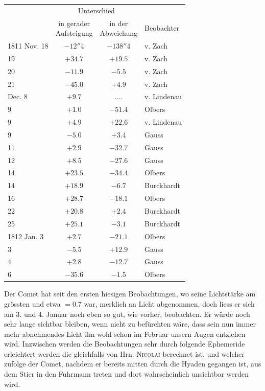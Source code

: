 \begin{center}
\fontsize{10}{12}\selectfont\setlength{\tabcolsep}{5pt}\renewcommand{\arraystretch}{1.15}\begin{tabular}{l|c|c|l}
 & \multicolumn{2}{c|}{Unterschied} & \\
 & \shortstack{in gerader\\Aufsteigung} & \shortstack{in der\\Abweichung} & Beobachter \\
\hline
1811 Nov. 18 & $-12''4$ & $-138''4$ & v. Zach \\
19 & $+34.7$ & $+19.5$ & v. Zach \\
20 & $-11.9$ & $-5.5$ & v. Zach \\
21 & $-45.0$ & $+4.9$ & v. Zach \\
Dec. 8 & $+9.7$ & .\;.\;.\;. & v. Lindenau \\
9 & $+1.0$ & $-51.4$ & Olbers \\
9 & $+4.9$ & $+22.6$ & v. Lindenau \\
9 & $-5.0$ & $+3.4$ & Gauss \\
11 & $+2.9$ & $-32.7$ & Gauss \\
12 & $+8.5$ & $-27.6$ & Gauss \\
14 & $+23.5$ & $-34.4$ & Olbers \\
14 & $+18.9$ & $-6.7$ & Burckhardt \\
16 & $+28.7$ & $-18.1$ & Olbers \\
22 & $+20.8$ & $+2.4$ & Burckhardt \\
25 & $+25.1$ & $-3.1$ & Burckhardt \\
1812 Jan. 3 & $+2.7$ & $-21.1$ & Olbers \\
3 & $-5.5$ & $+12.9$ & Gauss \\
4 & $+2.8$ & $-12.7$ & Gauss \\
6 & $-35.6$ & $-1.5$ & Olbers \\
\end{tabular}
\end{center}

\par\indent Der Comet hat seit den ersten hiesigen Beobachtungen, wo seine Lichtstärke am grössten und etwa $= 0.7$ war, merklich an Licht abgenommen, doch liess er sich am 3. und 4. Januar noch eben so gut, wie vorher, beobachten. Er würde noch sehr lange sichtbar bleiben, wenn nicht zu befürchten wäre, dass sein nun immer mehr abnehmendes Licht ihn wohl schon im Februar unsern Augen entziehen wird. Inzwischen werden die Beobachtungen sehr durch folgende Ephemeride erleichtert werden die gleichfalls von Hrn. \textsc{Nicolai} berechnet ist, und welcher zufolge der Comet, nachdem er bereits mitten durch die Hyaden gegangen ist, aus dem Stier in den Fuhrmann treten und dort wahrscheinlich unsichtbar werden wird.
